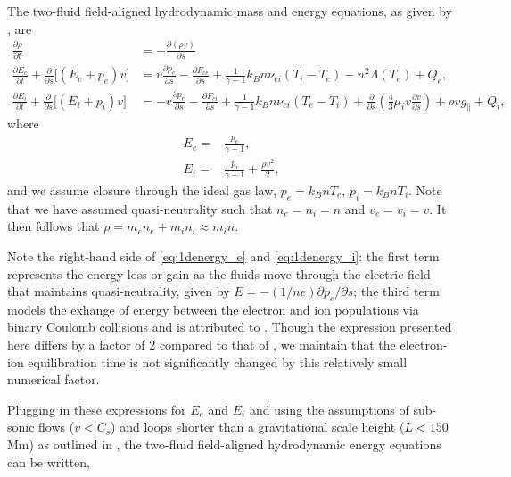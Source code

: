 \documentclass[apj]{emulateapj}
\begin{document}
	\section{}
	\label{appendix}
	\par The two-fluid field-aligned hydrodynamic mass and energy equations, as given by \citet{bradshaw_influence_2013}, are
	\begin{align}
		\frac{\partial\rho}{\partial t} &= -\frac{\partial(\rho v)}{\partial s} \label{eq:1dmass} \\[0.5em]
		\frac{\partial E_e}{\partial t} + \frac{\partial}{\partial s} \lbrack(E_e+p_e)v\rbrack &= v\frac{\partial p_e}{\partial s} - \frac{\partial F_{ce}}{\partial s} + \frac{1}{\gamma - 1}k_Bn\nu_{ei}(T_i-T_e) -n^2\Lambda(T_e)+Q_{e} , \label{eq:1denergy_e} \\[0.5em]
		\frac{\partial E_i}{\partial t} + \frac{\partial }{\partial s}\lbrack(E_i+p_i)v\rbrack &= -v\frac{\partial p_e}{\partial s} - \frac{\partial F_{ci}}{\partial s} + \frac{1}{\gamma - 1}k_Bn\nu_{ei}(T_e-T_i) + \frac{\partial}{\partial s}\left(\frac{4}{3}\mu_iv\frac{\partial v}{\partial s}\right) +\rho v g_{\parallel} + Q_{i},\label{eq:1denergy_i}
	\end{align}
	where
	\begin{align}
		E_e =& \frac{p_e}{\gamma - 1} \label{eq:ee_closure}, \\[0.5em]
		E_i =& \frac{p_i}{\gamma - 1} + \frac{\rho v^2}{2}, \label{eq:ei_closure}
	\end{align}
	and we assume closure through the ideal gas law, $p_e=k_BnT_e,\,p_i=k_BnT_i$. Note that we have assumed quasi-neutrality such that $n_e=n_i=n$ and $v_e=v_i=v$. It then follows that $\rho=m_en_e+m_in_i\approx m_in$.
	\par Note the right-hand side of \autoref{eq:1denergy_e} and \autoref{eq:1denergy_i}: the first term represents the energy loss or gain as the fluids move through the electric field that maintains quasi-neutrality, given by $E=-(1/ne)\partial p_e/\partial s$; the third term models the exhange of energy between the electron and ion populations via binary Coulomb collisions and is attributed to \citet{braginskii_transport_1965}. Though the expression presented here differs by a factor of 2 compared to that of \citeauthor{braginskii_transport_1965}, we maintain that the electron-ion equilibration time is not significantly changed by this relatively small numerical factor. 
	\par Plugging in these expressions for $E_e$ and $E_i$ and using the assumptions of sub-sonic flows ($v<C_s$) and loops shorter than a gravitational scale height ($L<150$ Mm) as outlined in \citet{klimchuk_highly_2008}, the two-fluid field-aligned hydrodynamic energy equations can be written,
\end{document}

